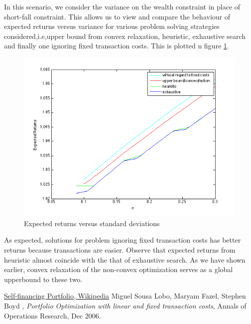 \documentclass[a4paper]{article}
\begin{document}
In this scenario, we consider the variance on the wealth constraint in place of short-fall constraint. 
This allows us to view and compare the behaviour of expected returns versus variance for various problem solving strategies considered,i.e,upper bound from convex relaxation, heuristic, exhaustive search and finally one ignoring fixed transaction costs. This is plotted n figure \ref{fig:3}. 

\begin{figure}
\centering
\includegraphics[width=5in]{mu_v_sigma_n=4_fixed.png}
\caption{Expected returns versus standard deviations}
\label{fig:3}
\end{figure}

As expected, solutions for problem ignoring fixed transaction costs has better returns because  transactions are easier. 
Observe that expected returns from heuristic almost coincide with the that of exhaustive search.
As we have shown earlier, convex relaxation of the non-convex optimization serves as a global upperbound to these two.

\begin{thebibliography}{10}

 \href{http://en.wikipedia.org/wiki/Self-financing\_portfolio}{Self-financing Portfolio, Wikipedia}
 Miguel Sousa Lobo, Maryam Fazel, Stephen Boyd , \textit{Portfolio Optimization with linear and fixed transaction costs}, Annals of Operations Research, Dec 2006.

\end{thebibliography}
\end{document}
